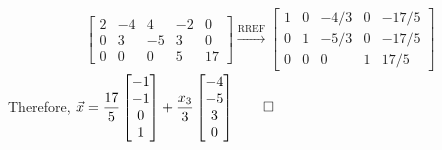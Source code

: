 \documentclass[12pt, a4paper]{article}
\begin{document}
\begin{enumerate}[Q\arabic*.]
\begin{enumerate}[(\alph*)]
        \begin{align*}
          \begin{bmatrix}2&-4&4&-2&0\\0&3&-5&3&0\\0&0&0&5&17\end{bmatrix} \xrightarrow{\text{RREF}}
          \begin{bmatrix}1&0&-4/3&0&-17/5\\0&1&-5/3&0&-17/5\\0&0&0&1&17/5\end{bmatrix}
        \end{align*}
        Therefore, $\vec{x} = \displaystyle \frac{17}{5}\begin{bmatrix}-1\\-1\\0\\1\end{bmatrix} + \frac{x_3}{3}\begin{bmatrix}-4\\-5\\3\\0\end{bmatrix} \qed$
    \end{enumerate}


\end{enumerate}
\end{document}
